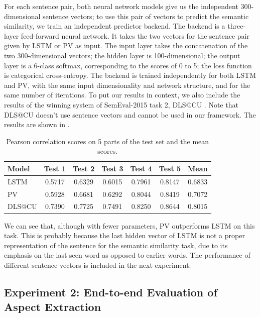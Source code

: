 For each sentence pair, both neural network models give us the 
independent 300-dimensional sentence vectors; to use this pair of vectors to 
predict the semantic similarity, we train an independent predictor backend.
The backend is a three-layer feed-forward neural network.
It takes the two vectors for the sentence pair given by LSTM or PV as input.
The input layer takes the concatenation of the two 300-dimensional vectors;
the hidden layer is 100-dimensional; 
the output layer is a 6-class softmax, corresponding to the scores of 0 to 5;
the loss function is categorical cross-entropy.
The backend is trained independently for both LSTM and PV, 
with the same input dimensionality and network structure, 
and for the same number of iterations. 
To put our results in context, we also include the results of 
the winning system of SemEval-2015 task 2, DLS@CU \cite{dlscu}. Note that
DLS@CU doesn't use sentence vectors and cannot be used in our framework.
The results are shown in .

\begin{table}
	\centering
	\caption{Pearson correlation scores on 5 parts of the test set and the mean scores.}
	\label{table:semeval}
	\begin{tabular}{|l|c|c|c|c|c|c|}
		\hline
		Model & Test 1 & Test 2 & Test 3 & Test 4 & Test 5 & Mean \\ \hline\hline
		LSTM  & 0.5717 & 0.6329 & 0.6015 & 0.7961 & 0.8147 & 0.6833 \\ \hline
		PV    & 0.5928 & 0.6681 & 0.6292 & 0.8044 & 0.8419 & 0.7072 \\ \hline
		DLS@CU & 0.7390 & 0.7725 & 0.7491 & 0.8250 & 0.8644 & 0.8015 \\ \hline
	\end{tabular}
\end{table}

We can see that, although with fewer parameters, 
PV outperforms LSTM on this task. 
This is probably because the last hidden vector of LSTM is not 
a proper representation of the sentence for the semantic similarity task, 
due to its emphasis on the last seen word as opposed to earlier words. 
The performance of different sentence vectors is included in the next experiment.

\subsection{Experiment 2: End-to-end Evaluation of Aspect Extraction}

